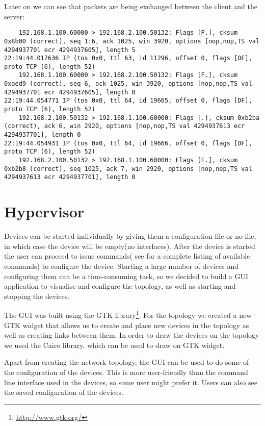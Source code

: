 Later on we can see that packets are being exchanged between the client and the server:
\lstset{language=text, caption=TCP traffic}
\begin{lstlisting}
    192.168.1.100.60000 > 192.168.2.100.50132: Flags [P.], cksum 0x8b00 (correct), seq 1:6, ack 1025, win 3920, options [nop,nop,TS val 4294937701 ecr 4294937605], length 5
22:19:44.017636 IP (tos 0x0, ttl 63, id 11296, offset 0, flags [DF], proto TCP (6), length 52)
    192.168.1.100.60000 > 192.168.2.100.50132: Flags [F.], cksum 0xaed9 (correct), seq 6, ack 1025, win 3920, options [nop,nop,TS val 4294937701 ecr 4294937605], length 0
22:19:44.054771 IP (tos 0x0, ttl 64, id 19665, offset 0, flags [DF], proto TCP (6), length 52)
    192.168.2.100.50132 > 192.168.1.100.60000: Flags [.], cksum 0xb2ba (correct), ack 6, win 2920, options [nop,nop,TS val 4294937613 ecr 4294937701], length 0
22:19:44.054931 IP (tos 0x0, ttl 64, id 19666, offset 0, flags [DF], proto TCP (6), length 52)
    192.168.2.100.50132 > 192.168.1.100.60000: Flags [F.], cksum 0xb2b8 (correct), seq 1025, ack 7, win 2920, options [nop,nop,TS val 4294937613 ecr 4294937701], length 0
\end{lstlisting}

\section{Hypervisor}
\label{sec:hypervisor2}

Devices can be started individually by giving them a configuration file or no file, in which case the device
will be empty(no interfaces). After the device is started the user can proceed to issue commands( see  
for a complete listing of available commands) to configure the device. Starting a large number of
devices and configuring them can be a time-consuming task, so we decided to build a GUI application to visualise and configure
the topology, as well as starting and stopping the devices.


The GUI was built using the GTK library\footnote{\url{http://www.gtk.org/}}. For the topology we created a new GTK widget
that allows us to create and place new devices in the topology as well as creating links between them. In order to draw
the devices on the topology we used the Cairo library, which can be used to draw on GTK widget.

Apart from creating the network topology, the GUI can be used to do some of the configuration of the devices. This is 
more user-friendly than the command line interface used in the devices, so some user might prefer it. Users can also see
the saved configuration of the devices.


